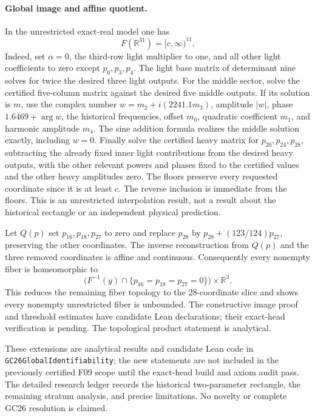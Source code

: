 \documentclass[11pt]{article}
\newcommand{\R}{\mathbb{R}}
\begin{document}
\paragraph{Global image and affine quotient.}
In the unrestricted exact-real model one has
\[
 F(\R^{31})=[c,\infty)^{11}.
\]
Indeed, set \(\alpha=0\), the third-row light multiplier to one,
and all other light coefficients to zero except \(p_0,p_3,p_4\).
The light base matrix of determinant nine solves for twice the
desired three light outputs. For the middle sector, solve the
certified five-column matrix against the desired five middle
outputs. If its solution is \(m\), use the complex number
\(w=m_2+i(2241.1m_3)\), amplitude \(|w|\), phase
\(1.6469+\arg w\), the historical frequencies, offset \(m_0\),
quadratic coefficient \(m_1\), and harmonic amplitude \(m_4\).
The sine addition formula realizes the middle solution exactly,
including \(w=0\). Finally solve the certified heavy matrix
for \(p_{20},p_{24},p_{28}\), subtracting the already fixed inner
light contributions from the desired heavy outputs, with the
other relevant powers and phases fixed to the certified values
and the other heavy amplitudes zero. The floors preserve every
requested coordinate since it is at least \(c\). The reverse
inclusion is immediate from the floors. This is an unrestricted
interpolation result, not a result about the historical rectangle
or an independent physical prediction.

Let \(Q(p)\) set \(p_{16},p_{18},p_{27}\) to zero and replace
\(p_{28}\) by \(p_{28}+(123/124)p_{27}\), preserving the other
coordinates. The inverse reconstruction from \(Q(p)\) and the
three removed coordinates is affine and continuous. Consequently
every nonempty fiber is homeomorphic to
\[
 \bigl(F^{-1}(y)\cap\{p_{16}=p_{18}=p_{27}=0\}\bigr)
 \times\R^3 .
\]
This reduces the remaining fiber topology to the 28-coordinate
slice and shows every nonempty unrestricted fiber is unbounded.
The constructive image proof and threshold estimates have
candidate Lean declarations; their exact-head verification is
pending. The topological product statement is analytical.

These extensions are analytical results and candidate Lean code in
\texttt{GC26GlobalIdentifiability}; the new statements are not included
in the previously certified F09 scope until the exact-head build and
axiom audit pass. The detailed research ledger records the historical
two-parameter rectangle, the remaining stratum analysis, and precise
limitations. No novelty or complete GC26 resolution is claimed.
\end{document}
